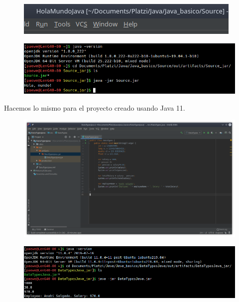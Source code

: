 \documentclass{article}
\begin{document}

\begin{figure}[h!]
  \centering
  \includegraphics[scale=0.75]{./Pictures/015_jar.png}
\end{figure}

\begin{figure}[h!]
  \centering
  \includegraphics[scale=0.75]{./Pictures/016_jar.png}
\end{figure}

Hacemos lo mismo para el proyecto creado usando Java 11.

\begin{figure}[h!]
  \centering
  \includegraphics[scale=0.45]{./Pictures/017_jar.png}
\end{figure}

\begin{figure}[h!]
  \centering
  \includegraphics[scale=0.75]{./Pictures/018_jar.png}
\end{figure}
\end{document}
